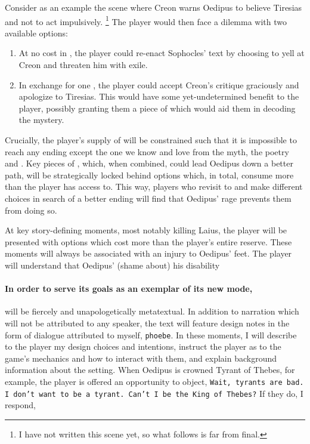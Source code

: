 Consider as an example the scene where Creon warns Oedipus to believe Tiresias and not to
act impulsively. \footnote{I have not written this scene yet, so what follows is far from
  final.} The player would then face a dilemma with two available options:

\begin{enumerate}
\item At no cost in \selfcontrol{}, the player could re-enact Sophocles' text by choosing
  to yell at Creon and threaten him with exile.
\item In exchange for one \selfcontrol{}, the player could accept Creon's critique
  graciously and apologize to Tiresias. This would have some yet-undetermined benefit to
  the player, possibly granting them a piece of \knowledge{} which would aid them in
  decoding the mystery.
\end{enumerate}

Crucially, the player's supply of \selfcontrol{} will be constrained such that it is
impossible to reach any ending except the one we know and love from the myth, the poetry
and \theplay{}. Key pieces of \knowledge{}, which, when combined, could lead Oedipus down
a better path, will be strategically locked behind options which, in total, consume more
\selfcontrol{} than the player has access to. This way, players who revisit to \thegame{}
and make different choices in search of a better ending will find that Oedipus' rage
prevents them from doing so.

At key story-defining moments, most notably killing Laius, the player will be presented
with options which cost more \selfcontrol{} than the player's entire reserve. These
moments will always be associated with an injury to Oedipus' feet. The player will
understand that Oedipus' (shame about) his disability

\paragraph*{In order to serve its goals as an exemplar of its new mode,} \thegame{} will
be fiercely and unapologetically metatextual. In addition to narration which will not be
attributed to any speaker, the text will feature design notes in the form of dialogue
attributed to myself, \texttt{phoebe}. In these moments, I will describe to the player my
design choices and intentions, instruct the player as to the game's mechanics and how to
interact with them, and explain background information about the setting. When Oedipus is
crowned Tyrant of Thebes, for example, the player is offered an opportunity to object,
\texttt{Wait, tyrants are bad. I don't want to be a tyrant. Can't I be the King of
  Thebes?} If they do, I respond,

